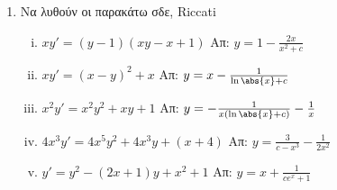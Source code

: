 


\everymath{\displaystyle}



\begin{center}
\end{center}

\vspace{\baselineskip}

\begin{enumerate}

\item Να λυθούν οι παρακάτω σδε, \textlatin{Riccati}

\begin{enumerate}[i)]

\item $xy'=(y-1)(xy-x+1)$ \hfill Απ: $y=1-\frac{2x}{x^2+c}$
\item $xy'=(x-y)^2+x$ \hfill Απ: $y=x-\frac{1}{\ln\abs{x}+c}$
\item $x^2y'=x^2y^2+xy+1$ \hfill Απ: $y=-\frac{1}{x(\ln\abs{x}+c)}-\frac{1}{x}$
\item $4x^3y'=4x^5y^2+4x^3y+(x+4)$ \hfill Απ: $y=\frac{3}{c-x^3}-\frac{1}{2x^2}$
\item $y'=y^2-(2x+1)y+x^2+1$ \hfill Απ: $y=x+\frac{1}{ce^x+1}$

\end{enumerate}

\end{enumerate}




